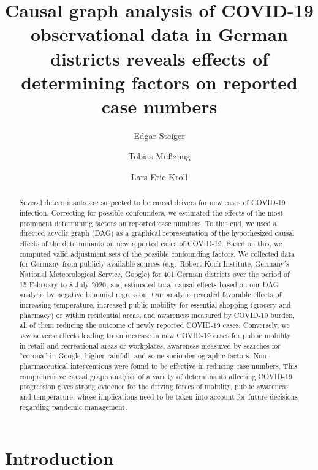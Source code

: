 \documentclass[]{elsarticle} %
\begin{document}
\begin{frontmatter}

  \title{Causal graph analysis of COVID-19 observational data in German districts reveals effects of determining factors on reported case numbers}
    \author[Zi]{Edgar Steiger}
    \author[Zi]{Tobias Mußgnug}
    \author[Zi]{Lars Eric Kroll}
      \address[Zi]{Central Research Institute of Ambulatory Health Care in Germany (Zi), Salzufer 8, D-10587 Berlin, Germany}
    
  \begin{abstract}
  Several determinants are suspected to be causal drivers for new cases of COVID-19 infection. Correcting for possible confounders, we estimated the effects of the most prominent determining factors on reported case numbers. To this end, we used a directed acyclic graph (DAG) as a graphical representation of the hypothesized causal effects of the determinants on new reported cases of COVID-19. Based on this, we computed valid adjustment sets of the possible confounding factors. We collected data for Germany from publicly available sources (e.g.~Robert Koch Institute, Germany's National Meteorological Service, Google) for 401 German districts over the period of 15 February to 8 July 2020, and estimated total causal effects based on our DAG analysis by negative binomial regression. Our analysis revealed favorable effects of increasing temperature, increased public mobility for essential shopping (grocery and pharmacy) or within residential areas, and awareness measured by COVID-19 burden, all of them reducing the outcome of newly reported COVID-19 cases. Conversely, we saw adverse effects leading to an increase in new COVID-19 cases for public mobility in retail and recreational areas or workplaces, awareness measured by searches for ``corona'' in Google, higher rainfall, and some socio-demographic factors. Non-pharmaceutical interventions were found to be effective in reducing case numbers. This comprehensive causal graph analysis of a variety of determinants affecting COVID-19 progression gives strong evidence for the driving forces of mobility, public awareness, and temperature, whose implications need to be taken into account for future decisions regarding pandemic management.
  \end{abstract}
  
 \end{frontmatter}

\hypertarget{introduction}{%
\section{Introduction}\label{introduction}}
\end{document}
